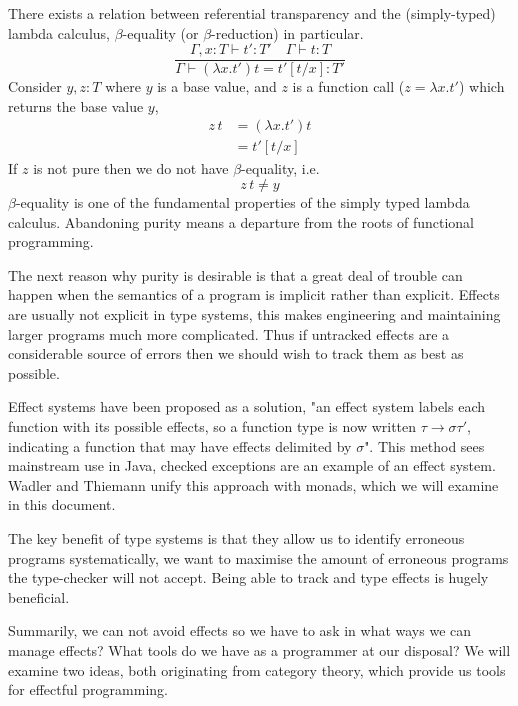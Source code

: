 There exists a relation between referential transparency and
the (simply-typed) lambda calculus,
$\beta$-equality (or $\beta$-reduction) in particular.
\begin{equation}
\frac
{\Gamma, x : T \vdash t\prime : T\prime \quad \Gamma \vdash t : T}
{\Gamma \vdash (\lambda x.t\prime)t = t\prime[t/x]: T\prime }
\end{equation}
Consider $y, z : T$ where $y$ is a base value,
and $z$ is a function call ($z = \lambda x.t\prime$)
which returns the base value $y$,
\begin{align}
    z\,t &= (\lambda x.t\prime)t \\
         &= t\prime[t/x]
\end{align}
If $z$ is not pure then we do not have $\beta$-equality, i.e.
\begin{equation}
    z\,t \neq y
\end{equation}
$\beta$-equality is one of the fundamental properties
of the simply typed lambda calculus.
Abandoning purity means a departure from
the roots of functional programming.

The next reason why purity is desirable is that
a great deal of trouble can happen when the semantics
of a program is implicit rather than explicit.
Effects are usually not explicit in type systems,
this makes engineering and
maintaining larger programs
much more complicated.
Thus if untracked effects are a considerable source of errors then we should
wish to track them as best as possible.

Effect systems\cite{jouvelot1991algebraic} have been proposed as a solution,
"an effect system labels each function with its possible effects,
so a function type is now written $\tau \rightarrow \sigma \tau\prime$,
indicating a function that may have effects delimited by $\sigma$".
This method sees mainstream use in Java,
checked exceptions are an example of an effect system.
Wadler and Thiemann\cite{wadler2003marriage}
unify this approach with monads, which we will examine in this document.

The key benefit of type systems is that they allow us to identify erroneous programs
systematically,
we want to maximise the amount of erroneous programs the type-checker will not accept.
Being able to track and type effects is hugely beneficial.

Summarily, we can not avoid effects so
we have to ask in what ways we can manage effects?
What tools do we have as a programmer at our disposal?
We will examine two ideas, both originating from category theory,
which provide us tools for effectful programming.
